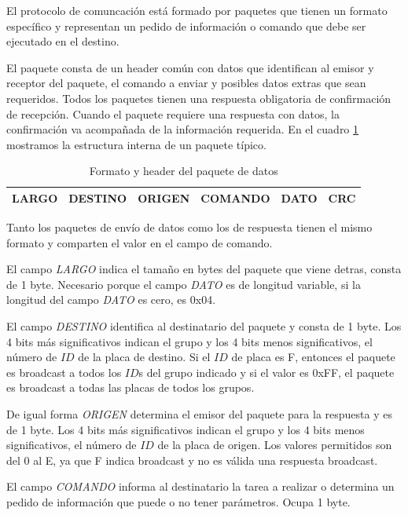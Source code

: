 El protocolo de comuncaci\'on est\'a formado por paquetes que tienen un formato espec\'ifico y representan un pedido de
informaci\'on o comando que debe ser ejecutado en el destino.

El paquete consta de un header com\'un con datos que identifican al emisor y receptor del paquete, el comando a enviar y
posibles datos extras que sean requeridos.
Todos los paquetes tienen una respuesta obligatoria de confirmaci\'on de recepci\'on.
Cuando el paquete requiere una respuesta con datos, la confirmaci\'on va acompa\~nada de la informaci\'on requerida.
En el cuadro \ref{hF_comm_paquete_tabla} mostramos la estructura interna de un paquete t\'ipico.

\begin{table}[ht]
	\begin{center}
		\begin{tabular}{|c|c|c|c|c|c|}
			\hline
			LARGO & DESTINO & ORIGEN & COMANDO & DATO & CRC \\
			\hline
		\end{tabular}
	\caption{Formato y header del paquete de datos}
	\label{hF_comm_paquete_tabla}
	\end{center}
\end{table}

Tanto los paquetes de env\'io de datos como los de respuesta tienen el mismo formato y comparten el valor en el campo de comando.

El campo \emph{LARGO} indica el tama\~no en bytes del paquete que viene detras, consta de 1 byte.
Necesario porque el campo \emph{DATO} es de longitud variable, si la longitud del campo \emph{DATO} es cero, es 0x04.

El campo \emph{DESTINO} identifica al destinatario del paquete y consta de 1 byte.
Los 4 bits m\'as significativos indican el grupo y los 4 bits menos significativos, el n\'umero de $ID$ de la placa de destino.
Si el $ID$ de placa es F, entonces el paquete es broadcast a todos los $ID$s del grupo indicado y si el valor es 0xFF, el paquete
es broadcast a todas las placas de todos los grupos.

De igual forma \emph{ORIGEN} determina el emisor del paquete para la respuesta y es de 1 byte.
Los 4 bits m\'as significativos indican el grupo y los 4 bits menos significativos, el n\'umero de $ID$ de la placa de origen.
Los valores permitidos son del $0$ al E, ya que F indica broadcast y no es v\'alida una respuesta broadcast.

El campo \emph{COMANDO} informa al destinatario la tarea a realizar o determina un pedido de informaci\'on que puede o no
tener par\'ametros.
Ocupa 1 byte.

